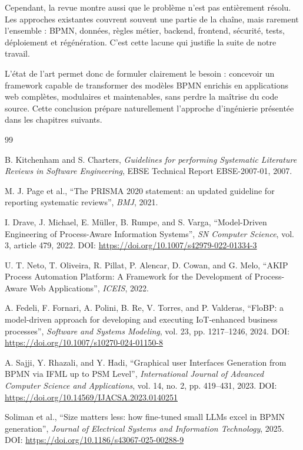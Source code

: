 \documentclass[12pt,a4paper]{article}
\begin{document}
Cependant, la revue montre aussi que le problème n'est pas entièrement résolu. Les approches existantes couvrent souvent une partie de la chaîne, mais rarement l'ensemble : BPMN, données, règles métier, backend, frontend, sécurité, tests, déploiement et régénération. C'est cette lacune qui justifie la suite de notre travail.

L'état de l'art permet donc de formuler clairement le besoin : concevoir un framework capable de transformer des modèles BPMN enrichis en applications web complètes, modulaires et maintenables, sans perdre la maîtrise du code source. Cette conclusion prépare naturellement l'approche d'ingénierie présentée dans les chapitres suivants.

\begin{thebibliography}{99}

B. Kitchenham and S. Charters, \textit{Guidelines for performing Systematic Literature Reviews in Software Engineering}, EBSE Technical Report EBSE-2007-01, 2007.

M. J. Page et al., ``The PRISMA 2020 statement: an updated guideline for reporting systematic reviews'', \textit{BMJ}, 2021.

I. Drave, J. Michael, E. Müller, B. Rumpe, and S. Varga, ``Model-Driven Engineering of Process-Aware Information Systems'', \textit{SN Computer Science}, vol. 3, article 479, 2022. DOI: \url{https://doi.org/10.1007/s42979-022-01334-3}

U. T. Neto, T. Oliveira, R. Pillat, P. Alencar, D. Cowan, and G. Melo, ``AKIP Process Automation Platform: A Framework for the Development of Process-Aware Web Applications'', \textit{ICEIS}, 2022.

A. Fedeli, F. Fornari, A. Polini, B. Re, V. Torres, and P. Valderas, ``FloBP: a model-driven approach for developing and executing IoT-enhanced business processes'', \textit{Software and Systems Modeling}, vol. 23, pp. 1217--1246, 2024. DOI: \url{https://doi.org/10.1007/s10270-024-01150-8}

A. Sajji, Y. Rhazali, and Y. Hadi, ``Graphical user Interfaces Generation from BPMN via IFML up to PSM Level'', \textit{International Journal of Advanced Computer Science and Applications}, vol. 14, no. 2, pp. 419--431, 2023. DOI: \url{https://doi.org/10.14569/IJACSA.2023.0140251}

Soliman et al., ``Size matters less: how fine-tuned small LLMs excel in BPMN generation'', \textit{Journal of Electrical Systems and Information Technology}, 2025. DOI: \url{https://doi.org/10.1186/s43067-025-00288-9}


\end{thebibliography}
\end{document}
